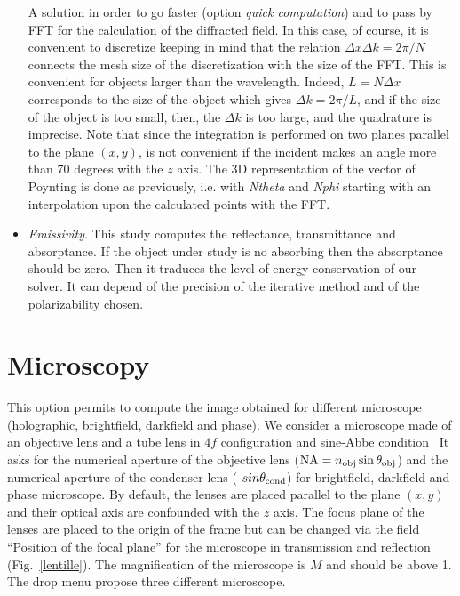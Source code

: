 \begin{itemize}
  A solution in order to go faster (option {\it quick computation})
  and to pass by FFT for the calculation of the diffracted field.  In
  this case, of course, it is convenient to discretize keeping in mind
  that the relation $\Delta x \Delta k=2\pi/N$ connects the mesh size
  of the discretization with the size of the FFT.  This is convenient
  for objects larger than the wavelength. Indeed, $L=N\Delta x$
  corresponds to the size of the object which gives $\Delta k=2\pi/L$,
  and if the size of the object is too small, then, the $\Delta k$ is
  too large, and the quadrature is imprecise. Note that since the
  integration is performed on two planes parallel to the plane
  $(x,y)$, is not convenient if the incident makes an angle more than
  70 degrees with the $z$ axis. The 3D representation of the vector of
  Poynting is done as previously, i.e. with {\it Ntheta} and {\it
    Nphi} starting with an interpolation upon the calculated points
  with the FFT.

\item {\it Emissivity}. This study computes the reflectance,
  transmittance and absorptance. If the object under study is no
  absorbing then the absorptance should be zero. Then it traduces the
  level of energy conservation of our solver. It can depend of the
  precision of the iterative method and of the polarizability chosen.

\end{itemize}
  
\section{Microscopy}
  
This option permits to compute the image obtained for different
microscope (holographic, brightfield, darkfield and phase). We
consider a microscope made of an objective lens and a tube lens in
$4f$ configuration and sine-Abbe condition~\cite{Abbe} It asks for the
numerical aperture of the objective lens
(${\rm NA}=n_{\rm obj} \sin\theta_{\rm obj}$) and the numerical
aperture of the condenser lens ( $sin \theta_{\rm cond}$) for
brightfield, darkfield and phase microscope.  By default, the lenses
are placed parallel to the plane $(x,y)$ and their optical axis are
confounded with the $z$ axis. The focus plane of the lenses are placed
to the origin of the frame but can be changed via the field ``Position
of the focal plane'' for the microscope in transmission and reflection
(Fig.~\ref{lentille}). The magnification of the microscope is $M$ and
should be above 1. The drop menu propose three different microscope.


